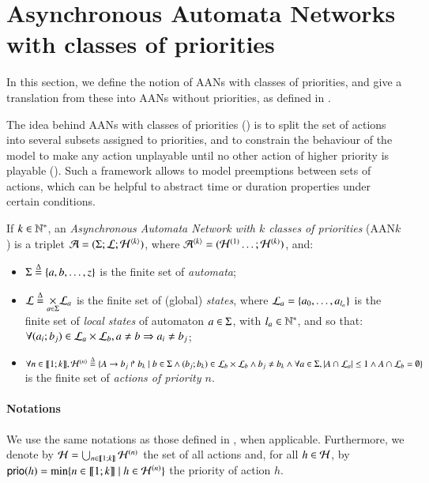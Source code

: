 \section{Asynchronous Automata Networks with classes of priorities}
\label{sec:flattening}

In this section, we define the notion of AANs with classes of priorities,
and give a translation from these into
AANs without priorities, as defined in .

The idea behind AANs with classes of priorities ()
is to split the set of actions into several subsets assigned to priorities,
and to constrain the behaviour of the model to make any action unplayable
until no other action of higher priority is playable ().
Such a framework allows to model preemptions between sets of actions,
which can be helpful to abstract time or duration properties under certain conditions.

\begin{definition}
\label{def:php}
  If $k \in \mathbb{N}^*$,
  an \emph{Asynchronous Automata Network with $k$ classes of priorities} (AAN$k$)
  is a triplet $\mathcal{A} = (\Sigma; \mathcal{L}; \mathcal{H}^{{\langle k \rangle}})$,
  where $\mathcal{A}^{{\langle k \rangle}} = (\mathcal{H}^{(1)} \dots; \mathcal{H}^{(k)})$,
  and:
  \begin{itemize}
    \item $\Sigma \stackrel{\Delta}= \{a, b, \dots, z\}$ is the finite set of \emph{automata};
    \item $\mathcal{L} \stackrel{\Delta}= \underset{a \in \Sigma}{\times} \mathcal{L}_a$ is the finite set of
      (global) \emph{states},
      where $\mathcal{L}_a = \{a_0, \ldots, a_{l_a}\}$ is the finite set of \emph{local states}
      of automaton $a \in \Sigma$, with $l_a \in \mathbb{N}^*$,
      and so that:
      $\forall (a_i; b_j) \in \mathcal{L}_a \times \mathcal{L}_b, a \neq b \Rightarrow a_i \neq b_j$;
    \item $\forall n \in \llbracket 1; k \rrbracket,
      \mathcal{H}^{(n)} \stackrel{\Delta}= \{A\rightarrow b_j\Rsh b_k \mid
      b \in \Sigma \wedge (b_j; b_k) \in \mathcal{L}_b \times \mathcal{L}_b \wedge
      b_j \neq b_k \wedge
      \forall a \in \Sigma, |A \cap \mathcal{L}_a| \leq 1 \wedge
      A \cap \mathcal{L}_b = \emptyset \}$ is the finite set of \emph{actions of priority $n$}.
  \end{itemize}
\end{definition}

\paragraph{Notations}
We use the same notations as those defined in , when applicable.
Furthermore,
we denote by $\mathcal{H} = \bigcup_{n \in \llbracket 1; k \rrbracket} \mathcal{H}^{(n)}$ the set of all actions
and, for all $h \in \mathcal{H}$,
by $\mathsf{prio}(h) = \min\{ n \in \llbracket 1; k \rrbracket \mid h \in \mathcal{H}^{(n)} \}$
the priority of action $h$.

